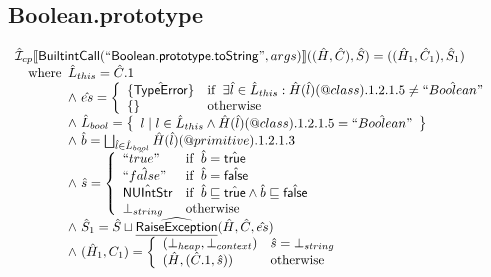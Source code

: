 \documentclass{article}
\makeatletter
\newcommand{\SF}[1]{\mbox{\textsf{#1}}}
\newcommand{\wherec}[1]{{\rm where}\begin{array}[t]{l}#1\end{array}}
\newcommand{\ifc}[1]{{\rm if}\begin{array}[t]{l}#1\end{array}}
\newcommand{\owc}{{\rm otherwise}}
\newcommand{\aI}{\hat{\mathcal{I}}}
\newcommand{\set}[1]{\left\{\begin{array}{l}#1\end{array}\right\}}
\newcommand{\lbr}{\llbracket}
\newcommand{\rbr}{\rrbracket}
\newcommand{\ahf}[1]{\widehat{\underline{\sf #1}}}
\newcommand{\varprop}[1]{@#1}
\newcommand{\atrue}{\hat{\SF{true}}}
\newcommand{\afalse}{\hat{\SF{false}}}
\makeatother
\begin{document}
\subsection{Boolean.prototype}
\[
\begin{array}{l}
\aI _{cp}\lbr \SF{BuiltintCall}(``\SF{Boolean.prototype.toString}",args)\rbr((\hat{H},\hat{C}), \hat{S})
  = ((\hat{H}_1, \hat{C}_1), \hat{S}_1)\\
\quad\wherec{
  \hat{L}_{this} = \hat{C}.1\\
  \land\ \hat{es} = \left\{\begin{array}{ll}
      \{\hat{\SF{TypeError}}\} 
      & \ifc{\exists \hat{l} \in \hat{L}_{this}:
          \hat{H}(\hat{l})(\varprop{class}).1.2.1.5 \neq \hat{``Boolean"}}\\
      \set{} & \owc
    \end{array}\right.\\
  \land\ \hat{L}_{bool} = 
    \set{ l \mid l \in \hat{L}_{this} \land  \hat{H}(\hat{l})(\varprop{class}).1.2.1.5 = \hat{``Boolean"}}\\
  \land\ \hat{b} = \bigsqcup_{\hat{l} \in \hat{L}_{bool}} \hat{H}(\hat{l})(\varprop{primitive}).1.2.1.3\\
  \land\ \hat{s} = \left\{\begin{array}{ll}
      \hat{``true"} & \ifc{\hat{b} = \atrue}\\
      \hat{``false"} & \ifc{\hat{b} = \afalse}\\
      \hat{\SF{NUIntStr}} & \ifc{\hat{b} \sqsubseteq \atrue \land \hat{b} \sqsubseteq \afalse}\\
      \bot_{string} & \owc
    \end{array}\right.\\
  \land\ \hat{S}_1 = \hat{S} \sqcup \ahf{RaiseException}(\hat{H}, \hat{C}, \hat{es})\\
  \land\  (\hat{H}_1, {C}_1) = \left\{\begin{array}{ll}
      (\bot_{heap}, \bot_{context}) & \hat{s} = \bot_{string}\\
      (\hat{H}, (\hat{C}.1, \hat{s})) & \owc\\
    \end{array}\right.
  }\\
\\\\



\end{array}\]
\end{document}

